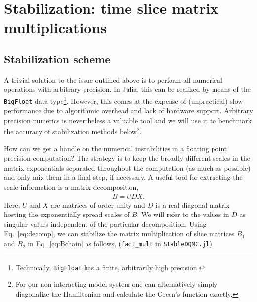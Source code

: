 \documentclass[submission, Phys]{SciPost}
\begin{document}

\section{\label{sec:stabilization}Stabilization: time slice matrix multiplications}

\subsection{Stabilization scheme}
A trivial solution to the issue outlined above is to perform all numerical operations with arbitrary precision. In Julia, this can be realized by means of the \texttt{BigFloat} data type\footnote{Technically, \texttt{BigFloat} has a finite, arbitrarily high precision.}. However, this comes at the expense of (unpractical) slow performance due to algorithmic overhead and lack of hardware support. Arbitrary precision numerics is nevertheless a valuable tool and we will use it to benchmark the accuracy of stabilization methods below\footnote{For our non-interacting model system one can alternatively simply diagonalize the Hamiltonian and calculate the Green's function exactly.}.


How can we get a handle on the numerical instabilities in a floating point precision computation? The strategy is to keep the broadly different scales in the matrix exponentials separated throughout the computation (as much as possible) and only mix them in a final step, if necessary. A useful tool for extracting the scale information is a matrix decomposition,
\begin{align}
	B = UDX. \label{eq:decomp}
\end{align}
Here, $U$ and $X$ are matrices of order unity and $D$ is a real diagonal matrix hosting the exponentially spread scales of $B$. We will refer to the values in $D$ as singular values independent of the particular decomposition. Using Eq.~\eqref{eq:decomp}, we can stabilize the matrix multiplication of slice matrices $B_1$ and $B_2$ in Eq.~\eqref{eq:Bchain} as follows, (\texttt{fact\_mult} in \texttt{StableDQMC.jl})
\end{document}
